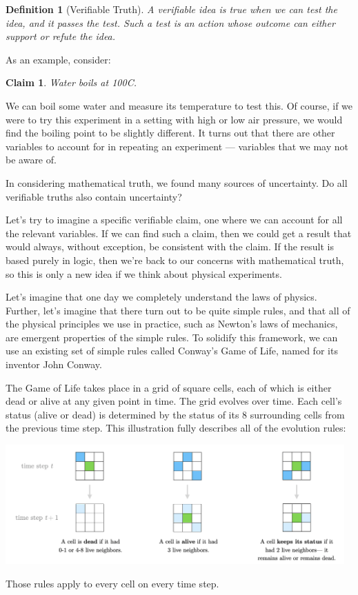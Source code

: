 \documentclass[11pt, oneside]{article}   	%
\newtheorem{defn}{Definition}
\newtheorem{claim}{Claim}
\begin{document}
\begin{defn}[Verifiable Truth]
    A verifiable idea is true when we can test the idea, and it passes
    the test. Such a test is an action whose outcome
    can either support or refute the idea.
\end{defn}

As an example, consider:
\begin{claim}
    Water boils at 100\/\degree C.
\end{claim}
We can boil some water and measure its temperature to test this.
Of course,
if we were to try this experiment in a setting with high or low air pressure, we
would find the boiling point to be slightly different.
It turns out that
there are other variables to account for in repeating an experiment ---
variables that we may not be aware of.

In considering mathematical truth, we found many sources of uncertainty.
Do all verifiable truths also contain uncertainty?

Let's try to imagine a specific verifiable claim, one where we can
account for all the relevant variables. If we can find such a claim, then we
could get a result that would always, without exception, be
consistent with the claim.
If the result is based purely in logic, then we're
back to our concerns with mathematical truth, so this is only a new idea if we
think about physical experiments.

Let's imagine that one day we completely understand the laws of physics.
Further, let's imagine that there turn out to be quite simple rules, and that
all of the physical principles we use in practice, such as Newton's laws of
mechanics, are emergent properties of the simple rules.
To solidify this framework, we can use an existing set of simple rules
called Conway's Game of Life, named for its inventor John Conway.

The Game of Life takes place in a grid of square cells, each of which is either
dead or alive at any given point in time. The grid evolves over
time. Each cell's status (alive or dead) is determined by the status of its 8
surrounding cells from the previous time step. This illustration fully
describes all of the evolution rules:
\begin{center}
\includegraphics[width=13cm]{gameoflife.png}
\end{center}
Those rules apply to every cell on every time step.
\end{document}
